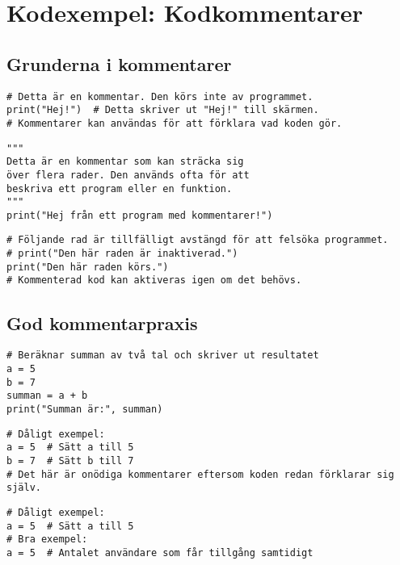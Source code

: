 \section{Kodexempel: Kodkommentarer}
\label{examples:comments}
\subsection*{Grunderna i kommentarer}


\begin{lstlisting}[title=Exempel 1: Enkel kommentar med \texttt{\#}]
# Detta är en kommentar. Den körs inte av programmet.
print("Hej!")  # Detta skriver ut "Hej!" till skärmen.
# Kommentarer kan användas för att förklara vad koden gör.
\end{lstlisting}

\begin{lstlisting}[title=Exempel 2: Multiradkommentarer med trippelcitat (\texttt{"""})]
"""
Detta är en kommentar som kan sträcka sig
över flera rader. Den används ofta för att
beskriva ett program eller en funktion.
"""
print("Hej från ett program med kommentarer!")
\end{lstlisting}

\begin{lstlisting}[title=Exempel 3: Kommentarer för felsökning]
# Följande rad är tillfälligt avstängd för att felsöka programmet.
# print("Den här raden är inaktiverad.")
print("Den här raden körs.")
# Kommenterad kod kan aktiveras igen om det behövs.
\end{lstlisting}

\subsection*{God kommentarpraxis}

\begin{lstlisting}[title=Exempel 4: Klara och tydliga kommentarer]
# Beräknar summan av två tal och skriver ut resultatet
a = 5
b = 7
summan = a + b
print("Summan är:", summan)
\end{lstlisting}

\begin{lstlisting}[title=Exempel 5: Kommentera inte självklarheter]
# Dåligt exempel:
a = 5  # Sätt a till 5
b = 7  # Sätt b till 7
# Det här är onödiga kommentarer eftersom koden redan förklarar sig själv.
\end{lstlisting}

\begin{lstlisting}[title=Exempel 6: Förklara varför och inte bara vad]
# Dåligt exempel:
a = 5  # Sätt a till 5
# Bra exempel:
a = 5  # Antalet användare som får tillgång samtidigt
\end{lstlisting}

